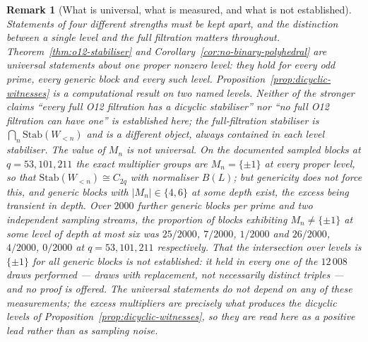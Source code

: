 \documentclass[11pt,a4paper]{article}
\newtheorem{remark}[theorem]{Remark}
\begin{document}
    \begin{remark}[What is universal, what is measured, and what is not established]
      \label{rem:o12-status}
      Statements of four different strengths must be kept apart, and the distinction between a
      single \emph{level} and the \emph{full filtration} matters throughout.
      Theorem~\ref{thm:o12-stabiliser} and Corollary~\ref{cor:no-binary-polyhedral} are
      universal statements about one proper nonzero level: they hold for every odd prime, every
      generic block and every such level.
      Proposition~\ref{prop:dicyclic-witnesses} is a computational result on two named levels.
      Neither of the stronger claims ``every full O12 filtration has a dicyclic stabiliser'' nor
      ``no full O12 filtration can have one'' is established here; the full-filtration
      stabiliser is $\bigcap_{n} \mathrm{Stab}(W_{<n})$ and is a different object, always
      contained in each level stabiliser.
      The \emph{value} of $M_{n}$ is not universal.
      On the documented sampled blocks at $q = 53, 101, 211$ the exact multiplier groups are
      $M_{n} = \{\pm 1\}$ at every proper level, so that $\mathrm{Stab}(W_{<n}) \cong C_{2q}$
      with normaliser $B(L)$; but genericity does not force this, and generic blocks with
      $|M_{n}| \in \{4, 6\}$ at some depth exist, the excess being transient in depth.
      Over $2000$ further generic blocks per prime and two independent sampling streams, the
      proportion of blocks exhibiting $M_{n} \neq \{\pm 1\}$ at some level of depth at most six
      was $25/2000$, $7/2000$, $1/2000$ and $26/2000$, $4/2000$, $0/2000$ at
      $q = 53, 101, 211$ respectively.
      That the intersection over levels is $\{\pm 1\}$ for \emph{all} generic blocks is
      \emph{not established}: it held in every one of the $12\,008$ draws performed --- draws
      with replacement, not necessarily distinct triples --- and no proof is offered.
      The universal statements do not depend on any of these measurements; the excess
      multipliers are precisely what produces the dicyclic levels of
      Proposition~\ref{prop:dicyclic-witnesses}, so they are read here as a positive lead rather
      than as sampling noise.
    \end{remark}
\end{document}
